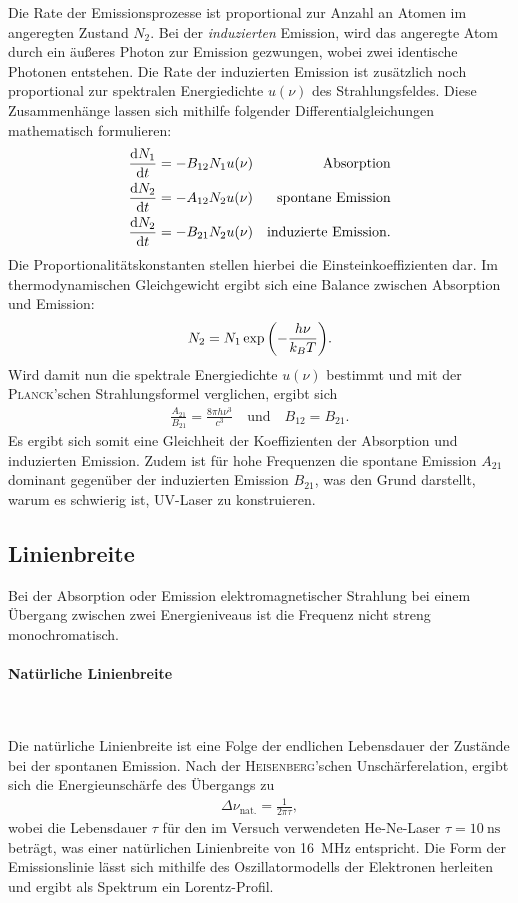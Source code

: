 \documentclass[a4paper,twoside,final]{article}
\begin{document}
Die Rate der Emissionsprozesse ist proportional zur Anzahl an Atomen im angeregten Zustand $N_2$. Bei der \emph{induzierten} Emission, wird das angeregte Atom durch ein äußeres Photon zur Emission gezwungen, wobei zwei identische Photonen entstehen. Die Rate der induzierten Emission ist zusätzlich noch proportional zur spektralen Energiedichte $u(\nu)$ des Strahlungsfeldes. Diese Zusammenhänge lassen sich mithilfe folgender Differentialgleichungen mathematisch formulieren:
\begin{align}
  \dv{N_1}{t} &= - B_{12} N_1 u(\nu) & \text{Absorption}\\
  \dv{N_2}{t} &= - A_{12} N_2 u(\nu) & \text{spontane Emission}\\
  \dv{N_2}{t} &= - B_{21} N_2 u(\nu) & \text{induzierte Emission}.
\end{align}
Die Proportionalitätskonstanten stellen hierbei die Einsteinkoeffizienten dar. Im thermodynamischen Gleichgewicht ergibt sich eine Balance zwischen Absorption und Emission:
\begin{align}
  N_2 = N_1 \exp\qty(-\frac{h\nu}{k_B T}).
\end{align}
Wird damit nun die spektrale Energiedichte $u(\nu)$ bestimmt und mit der \textsc{Planck}'schen Strahlungsformel verglichen, ergibt sich
\begin{align}
  \frac{A_{21}}{B_{21}} = \frac{8\pi h \nu^3}{c^3} \quad \text{und} \quad B_{12} = B_{21}.
\end{align}
Es ergibt sich somit eine Gleichheit der Koeffizienten der Absorption und induzierten Emission. Zudem ist für hohe Frequenzen die spontane Emission $A_{21}$ dominant gegenüber der induzierten Emission $B_{21}$, was den Grund darstellt, warum es schwierig ist, UV-Laser zu konstruieren.

\subsection{Linienbreite}
Bei der Absorption oder Emission elektromagnetischer Strahlung bei einem Übergang zwischen zwei Energieniveaus ist die Frequenz nicht streng monochromatisch.

\paragraph{Natürliche Linienbreite}$~$

Die natürliche Linienbreite ist eine Folge der endlichen Lebensdauer der Zustände bei der spontanen Emission. Nach der \textsc{Heisenberg}'schen Unschärferelation, ergibt sich die Energieunschärfe des Übergangs zu
\begin{align}
  \Delta \nu_\text{nat.} = \frac{1}{2\pi \tau},
\end{align}
wobei die Lebensdauer $\tau$ für den im Versuch verwendeten He-Ne-Laser $\tau = \SI{10}{\nano\second}$ beträgt, was einer natürlichen Linienbreite von \SI{16}{\mega\hertz} entspricht. Die Form der Emissionslinie lässt sich mithilfe des Oszillatormodells der Elektronen herleiten und ergibt als Spektrum ein Lorentz-Profil.
\end{document}
